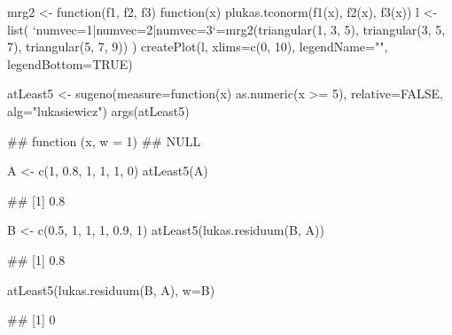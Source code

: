 \documentclass{article}\usepackage[]{graphicx}\usepackage[]{color}
\begin{document}
\begin{Schunk}
\begin{Sinput}
mrg2 <- function(f1, f2, f3) {
  function(x) {
    plukas.tconorm(f1(x), f2(x), f3(x))
  }
}
l <- list(
  `numvec=1|numvec=2|numvec=3`=mrg2(triangular(1, 3, 5), triangular(3, 5, 7), triangular(5, 7, 9))
)
createPlot(l, xlims=c(0, 10), legendName="", legendBottom=TRUE)
\end{Sinput}
\end{Schunk}

\begin{Schunk}
% --begin: "quant1"
\begin{Sinput}
atLeast5 <- sugeno(measure=function(x) as.numeric(x >= 5),
                   relative=FALSE,
                   alg="lukasiewicz")
args(atLeast5)
\end{Sinput}
\begin{Soutput}
## function (x, w = 1) 
## NULL
\end{Soutput}
%
% --end: "quant1"
\end{Schunk}

\begin{Schunk}
% --begin: "quant2"
\begin{Sinput}
A <- c(1, 0.8, 1, 1, 1, 0)
atLeast5(A)
\end{Sinput}
\begin{Soutput}
## [1] 0.8
\end{Soutput}
%
% --end: "quant2"
\end{Schunk}

\begin{Schunk}
% --begin: "quant3"
\begin{Sinput}
B <- c(0.5, 1, 1, 1, 0.9, 1)
atLeast5(lukas.residuum(B, A))
\end{Sinput}
\begin{Soutput}
## [1] 0.8
\end{Soutput}
%
% --end: "quant3"
\end{Schunk}

\begin{Schunk}
% --begin: "quant4"
\begin{Sinput}
atLeast5(lukas.residuum(B, A), w=B)
\end{Sinput}
\begin{Soutput}
## [1] 0
\end{Soutput}
%
% --end: "quant4"
\end{Schunk}
\end{document}
